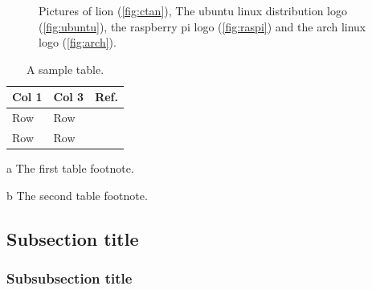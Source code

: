 \begin{figure}[h!]
{ \hspace{0.05\linewidth}
} %
	\caption[Short caption for contents.]{Pictures of \LaTeXe lion (\ref{fig:ctan}), The ubuntu linux distribution logo (\ref{fig:ubuntu}), the raspberry pi logo (\ref{fig:raspi}) and the arch linux logo (\ref{fig:arch}).}
 \label{fig:logos}  %
\end{figure}

\begin{table}
\centering
\caption[Table short caption.]{A sample table.} 
\hspace*{-0.8cm}
\begin{threeparttable}
\footnotesize
{\renewcommand\arraystretch{1.3}
\begin{tabular}{>{\raggedright}p{4cm} >{\raggedright}p{4cm} >{\raggedright\arraybackslash}p{4cm}}
	\toprule
\textsf{\bfseries Col 1}  & \textsf{\bfseries Col 3}  &\textsf{\bfseries Ref.}  \\ 
	\midrule
Row     & Row   & \cite{Example2019} \\
Row	 & Row   &  \cite{Example2019} \\
	\bottomrule
\end{tabular}
}
\begin{tablenotes}
\footnotesize
\item [a] The first table footnote.
\item [b] The second table footnote.
\end{tablenotes}
\end{threeparttable}
\label{tab:endUse}
\end{table}

\subsection{Subsection title}
\subsubsection{Subsubsection title}
\blindtext

